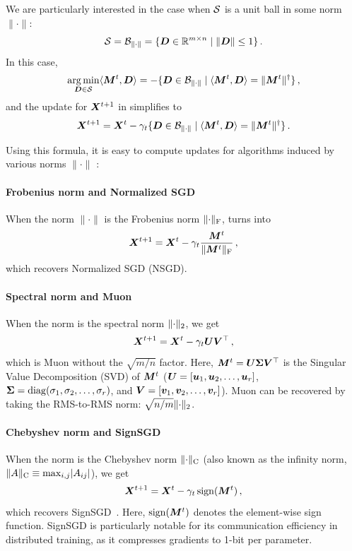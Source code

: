 \documentclass[pmlr]{jmlr}%
\newcommand{\norm}[1]{\lVert #1\rVert}
\DeclarePairedDelimiter{\normf}{\|}{\|_\mathrm{F}}
\DeclarePairedDelimiter{\norms}{\|}{\|_{\mathrm{2}}}
\DeclarePairedDelimiter{\normc}{\|}{\|_{\mathrm{C}}}
\DeclarePairedDelimiter{\abs}{\lvert}{\rvert}
\def\<#1,#2>{\langle #1,#2\rangle}
\DeclareMathOperator{\diag}{diag}
\newcommand{\Rmn}{\R^{m\times n}}
\begin{document}
 We are particularly interested in the case when $\mathcal{S}$ is a unit ball in some norm $\norm{\cdot}$:
 \[
 \cS = \cB_{\norm{\cdot}} = \{ \mD \in \Rmn \mid \norm{\mD} \leq 1 \}\,.
 \]
 In this case,
 \[
 \argmin_{\mD \in \cS} \<\mM^t, \mD> = - \{ \mD \in \cB_{\norm{\cdot}} \mid \<\mM^t, \mD> = \norm{\mM^t}^\dagger\}\,,
 \]
 and the update for ${\bm{X}}^{t + 1}$ in  simplifies to
 \begin{equation}\label{eq:our_update}
   \mX^{t+1} = \mX^{t} - \gamma_t \{\mD \in \cB_{\norm{\cdot}} \mid \<\mM^t, \mD> = \norm{\mM^t}^\dagger\}\,.
 \end{equation}
 
 Using this formula, it is easy to compute updates for algorithms induced by various norms $\norm{\cdot}$ \citep{bernstein2024oldoptimizernewnorm, pethick2025training}:
 
 \paragraph{Frobenius norm and Normalized SGD}
 When the norm $\norm{\cdot}$ is the Frobenius norm $\normf{\cdot}$,  turns into
 \begin{equation}\label{eq:nsgd_update}
   \mX^{t+1} = \mX^{t} - \gamma_t \frac{\mM^t}{\normf{\mM^t}}\,,
 \end{equation}
 which recovers Normalized SGD (NSGD).
 
 \paragraph{Spectral norm and Muon}
 When the norm is the spectral norm $\norms{\cdot}$, we get
 \begin{equation}\label{eq:muon_update}
   {\bm{X}}^{t+1} = {\bm{X}}^{t} - \gamma_t {\bm{U}} {\bm{V}}^\top\,,
 \end{equation}
 which is Muon without the $\sqrt{m/n}$ factor.
 Here, ${\bm{M}}^t = {\bm{U}} {\bm{\Sigma}} {\bm{V}}^\top$ is the Singular Value Decomposition (SVD) of ${\bm{M}}^t$ (${\bm{U}} = [{\bm{u}}_1, {\bm{u}}_2, \dots, {\bm{u}}_r]$, $\mSigma = \diag(\sigma_1, \sigma_2, \dots, \sigma_r)$, and ${\bm{V}} = [{\bm{v}}_1, {\bm{v}}_2, \dots, {\bm{v}}_r]$). Muon can be recovered by taking the RMS-to-RMS norm: $\sqrt{n/m}\norms{\cdot}$.
 
 \paragraph{Chebyshev norm and SignSGD}
 When the norm is the Chebyshev norm $\normc{\cdot}$ (also known as the infinity norm, $\normc{A} \equiv \max_{i,j}\abs{A_{ij}}$), we get
 \begin{equation}\label{eq:signsgd_update}
   {\bm{X}}^{t+1} = {\bm{X}}^{t} - \gamma_t \operatorname{sign}({\bm{M}}^t)\,,
 \end{equation}
 which recovers SignSGD~\citep{bernstein2018signsgd}. Here, $\operatorname{sign}({\bm{M}}^t)$ denotes the element-wise sign function. SignSGD is particularly notable for its communication efficiency in distributed training, as it compresses gradients to 1-bit per parameter.
 
\end{document}
